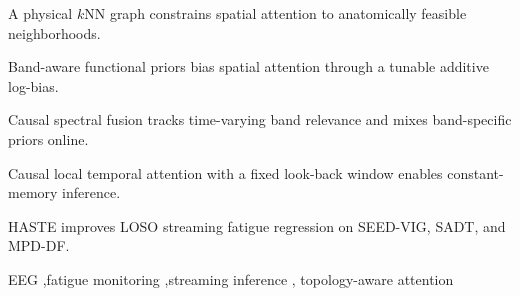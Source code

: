 \documentclass[preprint,12pt]{elsarticle}
\begin{document}
\begin{frontmatter}
\author{Yingnan Nie*}



\begin{abstract}
Streaming EEG fatigue monitoring is challenging because fatigue signatures are both frequency-dependent and spatially distributed across electrodes, while deployment requires strictly causal updates with bounded latency and memory. Existing Transformers weakly exploit electrode geometry and incur history-dependent cost, whereas graph models typically rely on fixed or unconstrained connectivity that is difficult to adapt as cognitive state changes. We propose HASTE, a hybrid-attention streaming topology-aware estimator that separates where interactions are allowed from how strongly they adapt: a physical $k$NN graph constrains spatial attention to anatomically feasible neighborhoods, and an online band-aware functional prior biases within-neighborhood attention through an additive log-bias. Causal spectral fusion tracks time-varying band relevance, and causal local temporal attention with a fixed look-back window enables constant-memory inference with respect to session length. Under leave-one-subject-out streaming evaluation on SEED-VIG, SADT, and MPD-DF, HASTE consistently outperforms six baselines, achieving PCCs of 0.827, 0.751, and 0.714, respectively, with ${\sim}$2.8\,ms per update and ${\sim}$47\,MB GPU memory on a single GPU.
\end{abstract}

\begin{highlights}
\item A physical $k$NN graph constrains spatial attention to anatomically feasible neighborhoods.
\item Band-aware functional priors bias spatial attention through a tunable additive log-bias.
\item Causal spectral fusion tracks time-varying band relevance and mixes band-specific priors online.
\item Causal local temporal attention with a fixed look-back window enables constant-memory inference.
\item HASTE improves LOSO streaming fatigue regression on SEED-VIG, SADT, and MPD-DF.
\end{highlights}

\begin{keyword}
EEG \sep fatigue monitoring \sep streaming inference \sep
topology-aware attention
\end{keyword}
\end{frontmatter}
\end{document}
